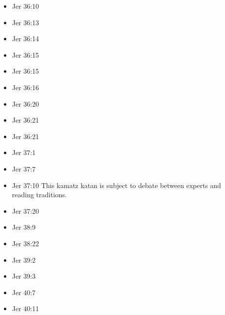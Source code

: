 \documentclass[14pt]{article}
\begin{document}
\begin{multicols}{2}
\begin{itemize}
								\item Jer 36:10
								
								\item Jer 36:13
								
								\item Jer 36:14
								
								\item Jer 36:15
								
								\item Jer 36:15
								
								\item Jer 36:16
								
								\item Jer 36:20
								
								\item Jer 36:21
								
								\item Jer 36:21
								
								\item Jer 37:1
								
								\item Jer 37:7
								
								\item Jer 37:10 This kamatz katan is subject to debate between experts and reading traditions.
								
								\item Jer 37:20
								
								\item Jer 38:9
								
								\item Jer 38:22
								
								\item Jer 39:2
								
								\item Jer 39:3
								
								\item Jer 40:7
								
								\item Jer 40:11
								

\end{itemize}
\end{multicols}
\end{document}
